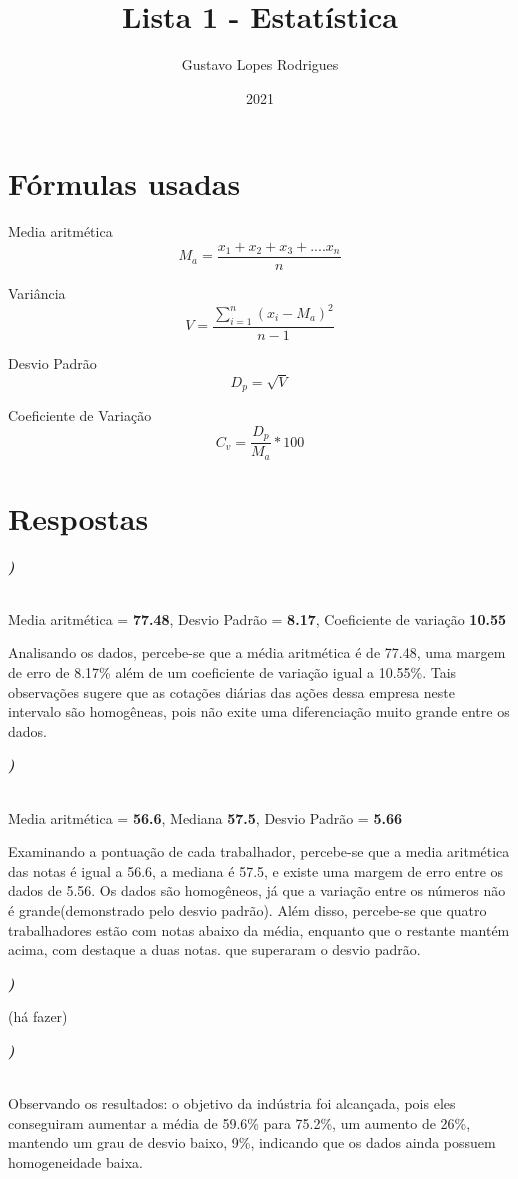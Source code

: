 \documentclass[12pt]{article}
\title{\textbf{Lista 1 - Estatística}}
\author{Gustavo Lopes Rodrigues}
\date{2021}
\newcounter{instn}
\newcommand{\instnum}{\arabic{instn}}
\newcommand{\myline}[1]{
    \emph{\textbf{#1)}}
    \addtocounter{instn}{1}
}
\begin{document}
    
    \maketitle

    \section*{Fórmulas usadas}

    Media aritmética \[ M_a = \frac{x_1 + x_2 + x_3 + .... x_n }{n} \]

    Variância \[ V = \frac{\sum_{i=1}^{n} (x_i - M_a)^2}{n-1}\]

    Desvio Padrão \[ D_p = \sqrt{V}\]

    Coeficiente de Variação \[ C_v = \frac{D_p}{M_a} * 100\]

    \newpage

    \section*{Respostas}

    \myline{\instnum} \\ Media aritmética = \textbf{77.48}, Desvio Padrão = \textbf{8.17}, Coeficiente de variação \textbf{10.55}


    Analisando os dados, percebe-se que a média aritmética é de 77.48, uma margem de erro de 8.17\% além 
    de um coeficiente de variação igual a 10.55\%. Tais observações sugere que 
    as cotações diárias das ações dessa empresa neste intervalo são homogêneas, pois não exite 
    uma diferenciação muito grande entre os dados.

    \myline{\instnum} \\ Media aritmética = \textbf{56.6}, Mediana \textbf{57.5}, Desvio Padrão = \textbf{5.66}


    Examinando a pontuação de cada trabalhador, percebe-se que a media aritmética das notas é igual a 
    56.6, a mediana é 57.5, e existe uma margem de erro entre os dados de 5.56. Os dados são homogêneos,
    já que a variação entre os números não é grande(demonstrado pelo desvio padrão). Além disso, percebe-se que quatro 
    trabalhadores estão com notas abaixo da média, enquanto que o restante mantém acima, com destaque a duas notas. que superaram
    o desvio padrão. 


    \myline{\instnum} (há fazer) 


    \myline{\instnum} \\ Observando os resultados: o objetivo da indústria foi alcançada, pois eles conseguiram aumentar
    a média de 59.6\% para 75.2\%, um aumento de 26\%, mantendo um grau de desvio baixo, 9\%, indicando que os dados
    ainda possuem homogeneidade baixa.
\end{document}
